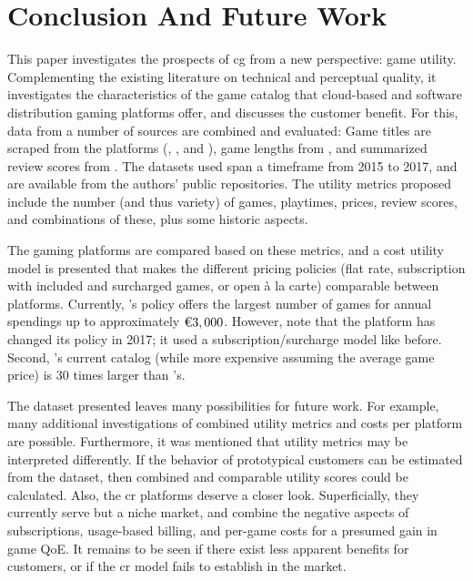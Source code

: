 \section{Conclusion And Future Work}
\label{sec:conclusion}

This paper investigates the prospects of \gls{cg} from a new
perspective: game utility. Complementing the existing literature
on technical and perceptual quality, it
investigates the characteristics of the game catalog
that cloud-based and software distribution gaming
platforms offer, and discusses the customer benefit.
For this, data from a number of sources are combined and evaluated:
Game titles are scraped from the platforms (\gfnow, \psnow, and \steam),
game lengths from \hltb, and summarized review scores from
\metacritic.
The datasets used span a timeframe from 2015 to 2017, and are
available from the authors' public repositories.
The utility metrics proposed include the number (and thus variety)
of games, playtimes, prices, review scores, and combinations of these,
plus some historic aspects.

The gaming platforms are compared based on these metrics, and a
cost utility model is presented that makes the different pricing
policies (flat rate, subscription with included and surcharged
games, or open à la carte) comparable between platforms.
Currently, \psnow's policy offers the largest number of games
for annual spendings up to approximately $\text{\texteuro} 3,000$. However,
note that the platform has changed its policy
in 2017; it used a subscription/surcharge model like \gfnow
before. Second, \steam's current catalog (while more expensive
assuming the average game price) is 30 times larger than
\psnow's.

The dataset presented leaves many possibilities
for future work. For example, many additional investigations of
combined utility metrics and costs per platform are possible.
Furthermore, it was mentioned that utility metrics may be
interpreted differently. If the behavior of prototypical customers
can be estimated from the dataset, then combined and comparable
utility scores could be calculated.
Also, the \gls{cr} platforms deserve a closer look. Superficially,
they currently serve but a niche market, and combine the negative
aspects of subscriptions, usage-based billing, and per-game costs
for a presumed gain in game \gls{QoE}. It remains to be seen
if there exist less apparent benefits for customers, or if the
\gls{cr} model fails to establish in the market.

